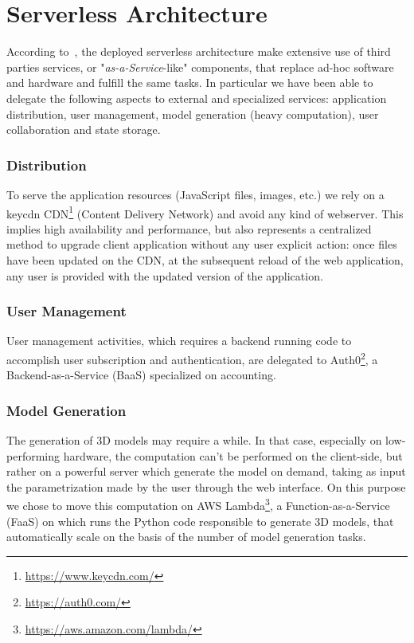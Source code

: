 \section{Serverless Architecture}\label{sec:architecture}

According to~\cite{Roberts}, the deployed serverless architecture make extensive use of third parties services, or "\emph{as-a-Service}-like" components, that replace ad-hoc software and hardware and fulfill the same tasks. In particular we have been able to delegate the following aspects to external and specialized services: application distribution, user management, model generation (heavy computation), user collaboration and state storage.


\subsubsection*{Distribution}

To serve the application resources (JavaScript files, images, etc.) we rely on a keycdn CDN\footnote{\url{https://www.keycdn.com/}} (Content Delivery Network) and avoid any kind of webserver. This implies high availability and performance, but also represents a centralized method to upgrade client application without any user explicit action: once files have been updated on the CDN, at the subsequent reload of the web application, any user is provided with the updated version of the application.

\subsubsection*{User Management}

User management activities, which requires a backend running code to accomplish user subscription and authentication, are delegated to Auth0\footnote{\url{https://auth0.com/}}, a Backend-as-a-Service (BaaS) specialized on accounting.

\subsubsection*{Model Generation}

The generation of 3D models may require a while. In that case, especially on low-performing hardware, the computation can't be performed on the client-side, but rather on a powerful server which generate the model on demand, taking as input the parametrization made by the user through the web interface. On this purpose we chose to move this computation on AWS Lambda\footnote{\url{https://aws.amazon.com/lambda/}}, a Function-as-a-Service (FaaS) on which runs the Python code responsible to generate 3D models, that automatically scale on the basis of the number of model generation tasks.

